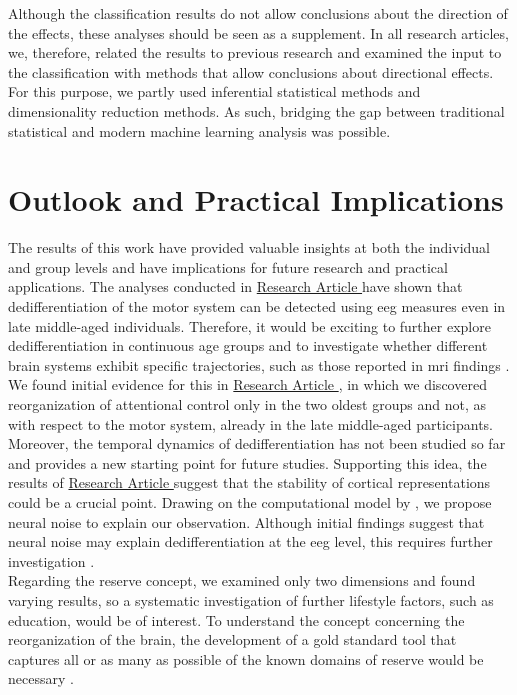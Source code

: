 Although the classification results do not allow conclusions about the direction of the effects, these analyses should be seen as a supplement. In all research articles, we, therefore, related the results to previous research and examined the input to the classification with methods that allow conclusions about directional effects. For this purpose, we partly used inferential statistical methods and dimensionality reduction methods. As such, bridging the gap between traditional statistical and modern machine learning analysis was possible.

\section{Outlook and Practical Implications}
The results of this work have provided valuable insights at both the individual and group levels and have implications for future research and practical applications. The analyses conducted in \hyperref[results:paperI]{Research Article } have shown that dedifferentiation of the motor system can be detected using \gls{eeg} measures even in late middle-aged individuals. Therefore, it would be exciting to further explore dedifferentiation in continuous age groups and to investigate whether different brain systems exhibit specific trajectories, such as those reported in \gls{mri} findings \cite{Raz2006}. We found initial evidence for this in \hyperref[results:paperII]{Research Article }, in which we discovered reorganization of attentional control only in the two oldest groups and not, as with respect to the motor system, already in the late middle-aged participants.\\
Moreover, the temporal dynamics of dedifferentiation has not been studied so far and provides a new starting point for future studies. Supporting this idea, the results of \hyperref[results:paperIII]{Research Article } suggest that the stability of cortical representations could be a crucial point. Drawing on the computational model by \citeauthor{Li2001} \cite{Li2001, Li2000}, we propose neural noise to explain our observation. Although initial findings suggest that neural noise may explain dedifferentiation at the \gls{eeg} level, this requires further investigation \cite{Pichot2022}.\\
Regarding the reserve concept, we examined only two dimensions and found varying results, so a systematic investigation of further lifestyle factors, such as education, would be of interest. To understand the concept concerning the reorganization of the brain, the development of a gold standard tool that captures all or as many as possible of the known domains of reserve would be necessary \cite{Nogueira2022}.\\
